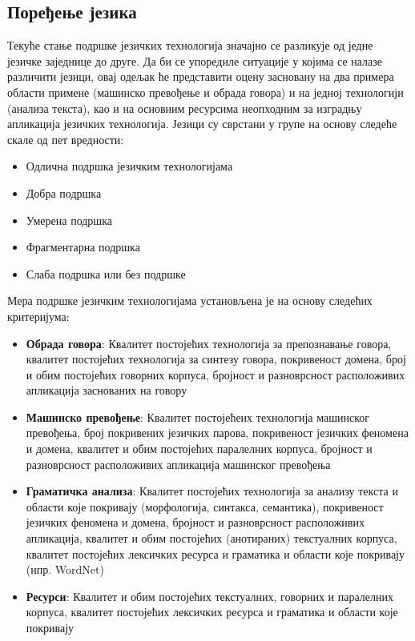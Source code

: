 {\begin{multicols}{2}
 \subsection {Поређење језика}
   
Текуће стање подршке језичких технологија значајно се разликује од једне језичке заједнице до друге. Да би се упоредиле ситуације у којима се налазе различити језици, овај одељак ће представити оцену засновану на два примера области примене (машинско превођење и обрада говора) и на једној технологији (анализа текста), као и на основним ресурсима неопходним за изградњу апликација језичких технологија.
Језици су сврстани у групе на основу следеће скале од пет вредности:
\begin{itemize}
\item Одлична подршка језичким технологијама
\item Добра подршка
\item Умерена подршка
\item Фрагментарна подршка
\item Слаба подршка или без подршке 
\end{itemize}
Мера подршке језичким технологијама установљена је на основу следећих критеријума:
\begin{itemize}
\item \textbf{Обрада говора}: Квалитет постојећих технологија за препознавање говора, квалитет постојећих технологија за синтезу говора, покривеност домена, број и обим постојећих говорних корпуса, бројност и разноврсност расположивих апликација заснованих на говору
\item \textbf{Машинско превођење}: Квалитет постојећеих технологија машинског превођења, број покривених језичких парова, покривеност језичких феномена и домена, квалитет и обим постојећих паралелних корпуса, бројност и разноврсност расположивих апликација машинског превођења 
\item \textbf{Граматичка анализа}: Квалитет постојећих технологија за анализу текста и области које покривају (морфологија, синтакса, семантика), покривеност језичких феномена и домена, бројност и разноврсност расположивих апликација, квалитет и обим постојећих (анотираних) текстуалних корпуса, квалитет постојећих лексичких ресурса и граматика и области које покривају (нпр. WordNet)
\item \textbf{Ресурси}: Квалитет и обим постојећих текстуалних, говорних и паралелних корпуса, квалитет постојећих лексичких ресурса и граматика и области које покривају
\end{itemize} 



\end{multicols}}
